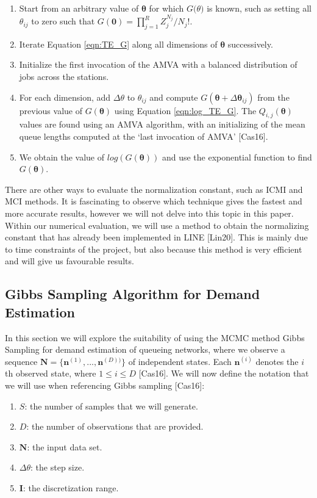 \documentclass[a4paper,11pt,titlepage]{article}
\begin{document}
\begin{enumerate}
    \item Start from an arbitrary value of $\bm{\theta}$ for which $G\bm({\theta})$ is known, such as setting all $\theta_{ij}$ to zero such that $G(\mathbf{0}) = \prod_{j=1}^{R} Z_{j}^{N_j}/N_j!$. 
    \item Iterate Equation \ref{eqn:TE_G} along all dimensions of $\bm{\theta}$ successively.
    \item Initialize the first invocation of the AMVA with a balanced distribution of jobs across the stations.
    \item For each dimension, add $\Delta \theta$ to $\theta_{ij}$ and compute $G(\bm{\theta} + \Delta \bm{\theta}_{ij})$ from the previous value of $G({\bm{\theta}})$ using Equation
    \ref{eqn:log_TE_G}. The $Q_{i,j}(\bm{\theta})$ values are found using an AMVA algorithm, with an initializing of the mean queue lengths computed at the `last invocation of AMVA' [Cas16].
    \item We obtain the value of $log(G(\bm{\theta}))$ and use the exponential function to find $G(\bm{\theta})$. 
\end{enumerate}

There are other ways to evaluate the normalization constant, such as ICMI and MCI methods. It is fascinating to observe which technique gives the fastest and more accurate results, however we will not delve into this topic in this paper. Within our numerical evaluation, we will use a method to obtain the normalizing constant that has already been implemented in LINE [Lin20]. This is mainly due to time constraints of the project, but also because this method is very efficient and will give us favourable results. 

\subsection{Gibbs Sampling Algorithm for Demand Estimation}

In this section we will explore the suitability of using the MCMC method Gibbs Sampling for demand estimation of queueing networks, where we observe a sequence $\mathbf{N} = \{\mathbf{n}^{(1)}, ..., \mathbf{n}^{(D))}\}$ of independent states. Each $\mathbf{n}^{(i)}$ denotes the $i$th observed state, where $1 \leq i \leq D$ [Cas16]. We will now define the notation that we will use when referencing Gibbs sampling [Cas16]: 

\begin{enumerate}
    \item $S$: the number of samples that we will generate. 
    \item $D$: the number of observations that are provided.
    \item $\mathbf{N}$: the input data set. 
    \item $\Delta \theta$: the step size. 
    \item $\mathbf{I}$: the discretization range.
\end{enumerate}
\end{document}
